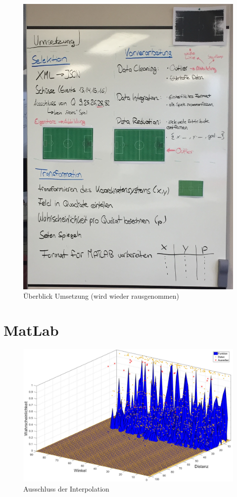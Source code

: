 \begin{figure}[H]
\centering
\includegraphics[scale=0.14]{se-wa-jpg/idee}
\caption[Überblick Umsetzung]{Überblick Umsetzung (wird wieder rausgenommen)}
\label{foo}
\end{figure}

\chapter{MatLab}

\begin{figure}[H]
\centering
\includegraphics[scale=0.34]{se-wa-jpg/inter}
\caption{Ausschluss der Interpolation}
\label{inter}
\end{figure}

